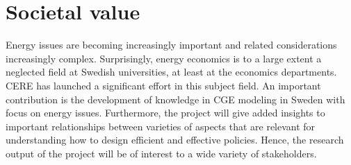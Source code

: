\section{Societal value}
Energy issues are becoming increasingly important and related considerations increasingly complex. Surprisingly, energy economics is to a large extent a neglected field at Swedish universities, at least at the economics departments. CERE has launched a significant effort in this subject field. An important contribution is the development of knowledge in CGE modeling in Sweden with focus on energy issues. Furthermore, the project will give added insights to important relationships between varieties of aspects that are relevant for understanding how to design efficient and effective policies. Hence, the research output of the project will be of interest to a wide variety of stakeholders.

